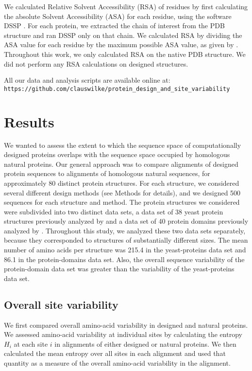 \documentclass[12pt]{article}
\begin{document}
We calculated Relative Solvent Accessibility (RSA) of residues by first calculating the absolute Solvent Accessibility (ASA) for each residue, using the software DSSP \citep{Kabsch1983}. For each protein, we extracted the chain of interest from the PDB structure and ran DSSP only on that chain. We calculated RSA by dividing the ASA value for each residue by the maximum possible ASA value, as given by \citet{Tien}. Throughout this work, we only calculated RSA on the native PDB structure. We did not perform any RSA calculations on designed structures.

All our data and analysis scripts are available online at:\\
\texttt{https://github.com/clauswilke/protein\_design\_and\_site\_variability}

\section{Results}
\label{Results}

We wanted to assess the extent to which the sequence space of computationally designed proteins overlaps with the sequence space occupied by homologous natural proteins. Our general approach was to compare alignments of designed protein sequences to alignments of homologous natural sequences, for approximately 80 distinct protein structures. For each structure, we considered several different design methods (see Methods for details), and we designed 500 sequences for each structure and method. The protein structures we considered were subdivided into two distinct data sets, a data set of 38 yeast protein structures previously analyzed by \citet{Ramsey2011} and a data set of 40 protein domains previously analyzed by \citet{OllikainenKortemme}. Throughout this study, we analyzed these two data sets separately, because they corresponded to structures of substantially different sizes. The mean number of amino acids per structure was 215.4 in the yeast-proteins data set and 86.1 in the protein-domains data set. Also, the overall sequence variability of the protein-domain data set was greater than the variability of the yeast-proteins data set. 

\subsection{Overall site variability}
\label{SiteVariability}

We first compared overall amino-acid variability in designed and natural proteins. We assessed amino-acid variability at individual sites by calculating the entropy $H_i$ at each site $i$ in alignments of either designed or natural proteins. We then calculated the mean entropy over all sites in each alignment and used that quantity as a measure of the overall amino-acid variability in the alignment.
\end{document}
